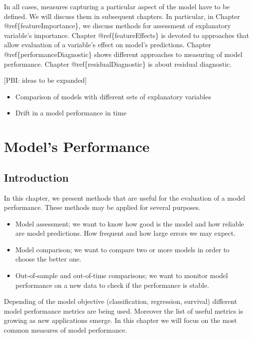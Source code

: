 \documentclass[12pt,]{krantz}
\providecommand{\tightlist}{%
  \setlength{\itemsep}{0pt}\setlength{\parskip}{0pt}}
\begin{document}
In all cases, measures capturing a particular aspect of the model have to be defined. We will discuss them in subsequent chapters. In particular, in Chapter @ref\{featureImportance\}, we discuss methods for assessment of explanatory variable's importance. Chapter @ref\{featureEffects\} is devoted to approaches that allow evaluation of a variable's effect on model's predictions.
Chapter @ref\{performanceDiagnostic\} shows different approaches to measuring of model performance. Chapter @ref\{residualDiagnostic\} is about residual diagnostic.

{[}PBI: ideas to be expanded{]}

\begin{itemize}
\tightlist
\item
  Comparison of models with different sets of explanatory variables
\item
  Drift in a model performance in time
\end{itemize}

\hypertarget{modelPerformance}{%
\section{Model's Performance}\label{modelPerformance}}

\hypertarget{modelPerformanceIntro}{%
\subsection{Introduction}\label{modelPerformanceIntro}}

In this chapter, we present methods that are useful for the evaluation of a model performance. These methods may be applied for several purposes.

\begin{itemize}
\tightlist
\item
  Model assessment; we want to know how good is the model and how reliable are model predictions. How frequent and how large errors we may expect.
\item
  Model comparison; we want to compare two or more models in order to choose the better one.
\item
  Out-of-sample and out-of-time comparisons; we want to monitor model performance on a new data to check if the performance is stable.
\end{itemize}

Depending of the model objective (classification, regression, survival) different model performance metrics are being used. Moreover the list of useful metrics is growing as new applications emerge. In this chapter we will focus on the most common measures of model performance.
\end{document}
